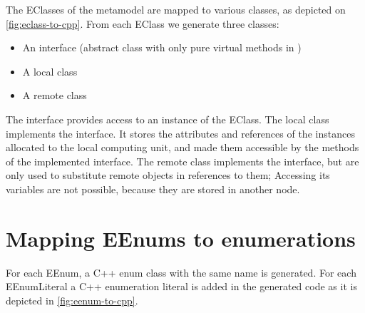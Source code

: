 The EClasses of the metamodel are mapped to various \cpp{} classes, as depicted on \mbox{\autoref{fig:eclass-to-cpp}}.
From each EClass we generate three \cpp{} classes:

\begin{itemize}
	\item An interface (abstract class with only pure virtual methods in \cpp{})
	\item A local class
	\item A remote class
\end{itemize}


The interface provides access to an instance of the EClass.
The local class implements the interface. It stores the attributes and references of the instances allocated to the local computing unit, and made them accessible by the methods of the implemented interface.
The remote class implements the interface, but are only used to substitute remote objects in references to them; 
Accessing its variables are not possible, because they are stored in another node. 

\section{Mapping EEnums to \protect\cpptt{} enumerations }

For each EEnum, a C++ enum class with the same name is generated. For each EEnumLiteral a C++ enumeration literal is added in the generated code as it is depicted in \autoref{fig:eenum-to-cpp}.

